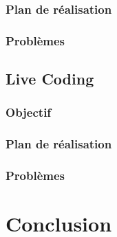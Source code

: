 \documentclass{report}
\begin{document}
\subsection{Plan de réalisation}
\subsection{Problèmes}
\section{Live Coding}
\subsection{Objectif}
\subsection{Plan de réalisation}
\subsection{Problèmes}

\chapter{Conclusion}


\printbibliography
\end{document}
